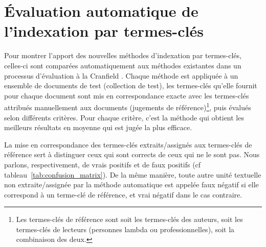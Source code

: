 
  \section{Évaluation automatique de l'indexation par termes-clés}
  \label{sec:main-state_of_the_art-automatic_evaluation_of_keyphrase_annotation}
    Pour montrer l'apport des nouvelles méthodes d'indexation par termes-clés,
    celles-ci sont comparées automatiquement aux méthodes existantes dans un
    processus d'évaluation \og{}à la Cranfield\fg{}
    \citep{voorhees2002philosophy}. Chaque méthode est appliquée à un ensemble
    de documents de test (collection de test), les termes-clés qu'elle fournit
    pour chaque document sont mis en correspondance \og{}exacte\fg{} avec les
    termes-clés attribués manuellement aux documents (jugements de
    référence)\footnote{Les termes-clés de référence sont soit les termes-clés
    des auteurs, soit les termes-clés de lecteurs (personnes lambda ou
    professionnelles), soit la combinaison des deux.}, puis évalués selon
    différents critères. Pour chaque critère, c'est la méthode qui obtient les
    meilleurs résultats en moyenne qui est jugée la plus efficace.
  
    La mise en correspondance des termes-clés extraits/assignés aux termes-clés
    de référence sert à distinguer ceux qui sont corrects de ceux qui ne le sont
    pas. Nous parlons, respectivement, de vrais positifs et de faux positifs (cf
    tableau~\ref{tab:confusion_matrix}). De la même manière, toute autre unité
    textuelle non extraite/assignée par la méthode automatique est appelée faux
    négatif si elle correspond à un terme-clé de référence, et vrai négatif dans
    le cas contraire.
    
